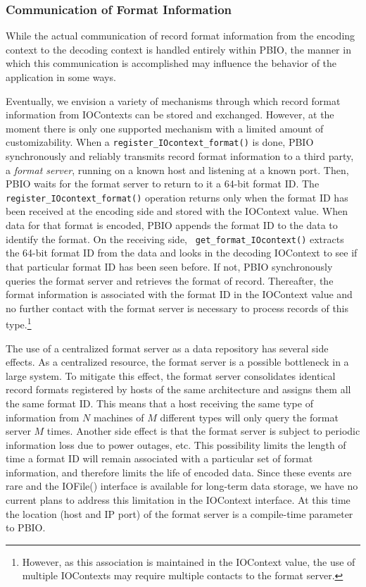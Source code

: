 \documentclass{article}
\begin{document}
\subsubsection{Communication of Format Information\label{sec:formats}}
While the actual communication of record format information from the encoding
context to the decoding context is handled entirely within PBIO, the manner in
which this communication is accomplished may influence the behavior of the
application in some ways.

Eventually, we envision a variety of mechanisms through which record format
information from IOContexts can be stored and exchanged.  However, at the
moment there is only one supported mechanism with a limited amount of
customizability.  When a {\tt register\_IOcontext\_format()} is done, PBIO
synchronously and reliably transmits record format information to a third
party, a {\it format server}, running on a known host and listening at a known
port.  Then, PBIO waits for the format server to return to it a 64-bit format
ID.  The {\tt register\_IOcontext\_format()} operation returns only when the
format ID has been received at the encoding side and stored with the IOContext
value.  When data for that format is encoded, PBIO appends the format ID to
the data to identify the format.  On the receiving side, {\tt
get\_format\_IOcontext()} extracts the 64-bit format ID from the data and looks
in the decoding IOContext to see if that particular format ID has been seen
before.  If not, PBIO synchronously queries the format server and retrieves
the format of record.  Thereafter, the format information is associated with
the format ID in the IOContext value and no further contact with the format
server is necessary to process records of this type.\footnote{However, as this
association is maintained in the IOContext value, the use of multiple
IOContexts may require multiple contacts to the format server.}  

The use of a centralized format server as a data repository has several side
effects.  As a centralized resource, the format server is a possible
bottleneck in a large system.  To mitigate this effect, the format server
consolidates identical record formats registered by hosts of the same
architecture and assigns them all the same format ID.  This means that a host
receiving the same type of information from $N$ machines of $M$ different
types will only query the format server $M$ times.  Another side effect is
that the format server is subject to periodic information loss due to power
outages, etc.  This possibility limits the length of time a format ID will
remain associated with a particular set of format information, and therefore
limits the life of encoded data.  Since these events are rare and the IOFile()
interface is available for long-term data storage, we have no current plans to
address this limitation in the IOContext interface.  At this time the location
(host and IP port) of the format server is a compile-time parameter to PBIO.
\end{document}
